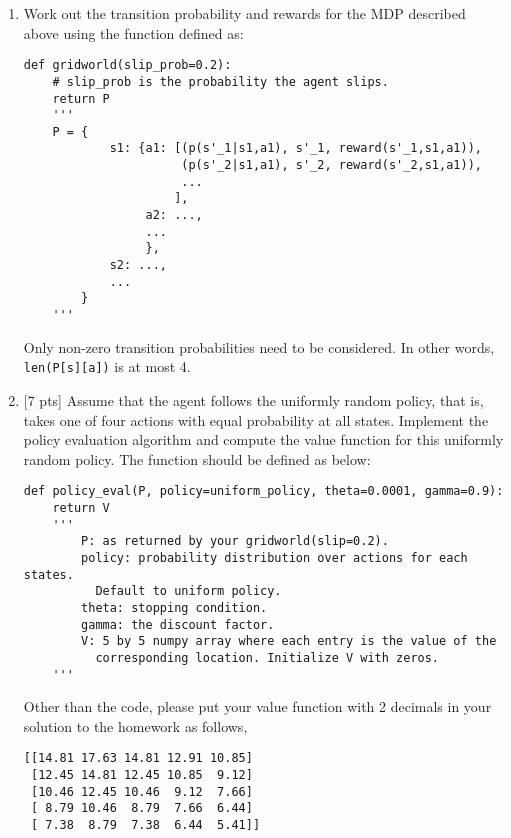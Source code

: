 \begin{enumerate}
    \item Work out the transition probability and rewards for the MDP described
    above using the function defined as:
    \begin{verbatim}
def gridworld(slip_prob=0.2):
    # slip_prob is the probability the agent slips.
    return P
    '''
    P = {
            s1: {a1: [(p(s'_1|s1,a1), s'_1, reward(s'_1,s1,a1)),
                      (p(s'_2|s1,a1), s'_2, reward(s'_2,s1,a1)),
                      ...
                     ],
                 a2: ...,
                 ...
                 },
            s2: ...,
            ...
        }
    '''
    \end{verbatim}
    Only non-zero transition probabilities need to be considered. In other
    words, \texttt{len(P[s][a])} is at most 4.

    \item{}[7 pts] Assume that the agent follows the uniformly random policy, that is,
    takes one of four actions with equal probability at all states.
    Implement the policy evaluation algorithm and compute the value
    function for this uniformly random policy.
    The function should be defined as below:
    \begin{verbatim}
def policy_eval(P, policy=uniform_policy, theta=0.0001, gamma=0.9):
    return V
    '''
        P: as returned by your gridworld(slip=0.2).
        policy: probability distribution over actions for each states.
          Default to uniform policy.
        theta: stopping condition.
        gamma: the discount factor.
        V: 5 by 5 numpy array where each entry is the value of the
          corresponding location. Initialize V with zeros.
    '''
    \end{verbatim}
    Other than the code, please put your value function with 2 decimals
    in your solution to the homework as follows,
    \begin{verbatim}
[[14.81 17.63 14.81 12.91 10.85]
 [12.45 14.81 12.45 10.85  9.12]
 [10.46 12.45 10.46  9.12  7.66]
 [ 8.79 10.46  8.79  7.66  6.44]
 [ 7.38  8.79  7.38  6.44  5.41]]
    \end{verbatim}


\end{enumerate}
